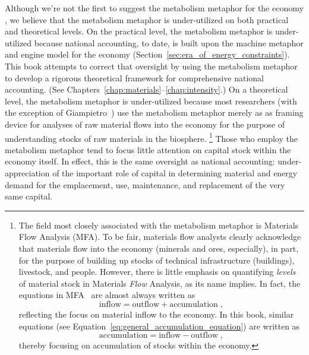 Although we're not the first to suggest the metabolism metaphor for the economy
\cite{Liu2012, Giampietro2000, Giampietro2013, F-K1999, F-K2003, Heijman:1988aa},
we believe that
the metabolism metaphor is under-utilized 
on both practical and theoretical levels.
On the practical level, the metabolism metaphor is under-utilized
because national accounting, to date, 
is built upon the machine metaphor and engine model for the economy
(Section~\ref{sec:era_of_energy_constraints}).
This book attempts to correct that oversight 
by using the metabolism metaphor 
to develop a rigorous theoretical framework 
for comprehensive national accounting.
(See Chapters~\ref{chap:materials}--\ref{chap:intensity}.)
On a theoretical level, the metabolism metaphor is under-utilized because 
most researchers (with the exception of Giampietro~\cite{Giampietro2000, Giampietro2013})
use the metabolism metaphor merely as as framing device for analyses of
raw material flows into the economy for the purpose of understanding 
stocks of raw materials in the biosphere.%
	\footnote{The field most closely associated with the metabolism metaphor is
	Materials Flow Analysis (MFA). 
	To be fair, materials flow analysts clearly acknowledge that 
	materials flow into the economy (minerals and ores, especially),
	in part,
	for the purpose of building up stocks of technical infrastructure (buildings),
	livestock, and people.\cite[p.~116]{F-K1999} 
	However, there is little emphasis on quantifying \emph{levels} 
	of material stock in Materials \emph{Flow} Analysis, 
	as its name implies.
	In fact, the equations in MFA~\cite[Equation~1]{F-K1999} are almost always written as%
	\begin{equation*}
		\mathrm{inflow} = \mathrm{outflow} + \mathrm{accumulation \; ,}
	\end{equation*}
	reflecting the focus on material inflow to the economy.
	In this book, similar equations 
	(see Equation~\ref{eq:general_accumulation_equation}) 
	are written as%
	\begin{equation*}
		\mathrm{accumulation} = \mathrm{inflow} - \mathrm{outflow \; ,}
	\end{equation*}
	thereby focusing on accumulation of stocks within the economy.
	}
Those who employ the metabolism metaphor
tend to focus little attention on capital stock within the economy itself.
In effect, this is the same oversight as national accounting: 
under-appreciation of the important role of capital
in determining material and energy demand 
for the emplacement, use, maintenance, and replacement of the very same capital.

